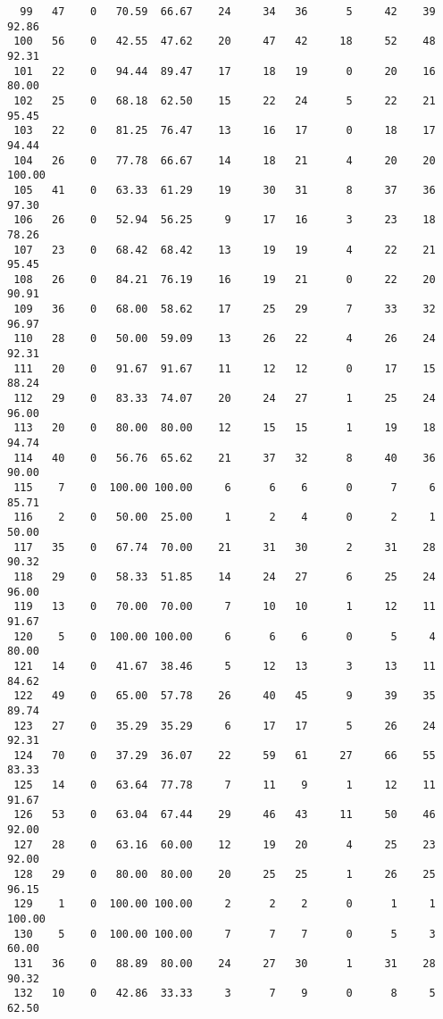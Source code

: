 \begin{verbatim}
  99   47    0   70.59  66.67    24     34   36      5     42    39    92.86
 100   56    0   42.55  47.62    20     47   42     18     52    48    92.31
 101   22    0   94.44  89.47    17     18   19      0     20    16    80.00
 102   25    0   68.18  62.50    15     22   24      5     22    21    95.45
 103   22    0   81.25  76.47    13     16   17      0     18    17    94.44
 104   26    0   77.78  66.67    14     18   21      4     20    20   100.00
 105   41    0   63.33  61.29    19     30   31      8     37    36    97.30
 106   26    0   52.94  56.25     9     17   16      3     23    18    78.26
 107   23    0   68.42  68.42    13     19   19      4     22    21    95.45
 108   26    0   84.21  76.19    16     19   21      0     22    20    90.91
 109   36    0   68.00  58.62    17     25   29      7     33    32    96.97
 110   28    0   50.00  59.09    13     26   22      4     26    24    92.31
 111   20    0   91.67  91.67    11     12   12      0     17    15    88.24
 112   29    0   83.33  74.07    20     24   27      1     25    24    96.00
 113   20    0   80.00  80.00    12     15   15      1     19    18    94.74
 114   40    0   56.76  65.62    21     37   32      8     40    36    90.00
 115    7    0  100.00 100.00     6      6    6      0      7     6    85.71
 116    2    0   50.00  25.00     1      2    4      0      2     1    50.00
 117   35    0   67.74  70.00    21     31   30      2     31    28    90.32
 118   29    0   58.33  51.85    14     24   27      6     25    24    96.00
 119   13    0   70.00  70.00     7     10   10      1     12    11    91.67
 120    5    0  100.00 100.00     6      6    6      0      5     4    80.00
 121   14    0   41.67  38.46     5     12   13      3     13    11    84.62
 122   49    0   65.00  57.78    26     40   45      9     39    35    89.74
 123   27    0   35.29  35.29     6     17   17      5     26    24    92.31
 124   70    0   37.29  36.07    22     59   61     27     66    55    83.33
 125   14    0   63.64  77.78     7     11    9      1     12    11    91.67
 126   53    0   63.04  67.44    29     46   43     11     50    46    92.00
 127   28    0   63.16  60.00    12     19   20      4     25    23    92.00
 128   29    0   80.00  80.00    20     25   25      1     26    25    96.15
 129    1    0  100.00 100.00     2      2    2      0      1     1   100.00
 130    5    0  100.00 100.00     7      7    7      0      5     3    60.00
 131   36    0   88.89  80.00    24     27   30      1     31    28    90.32
 132   10    0   42.86  33.33     3      7    9      0      8     5    62.50

\end{verbatim}

